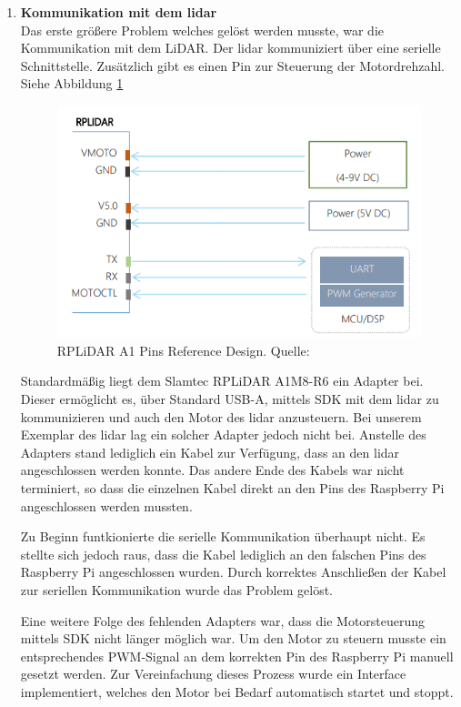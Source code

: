 \begin{enumerate}[leftmargin=*]
    \item \textbf{Kommunikation mit dem \ac{lidar}} \\
    Das erste größere Problem welches gelöst werden musste, war die Kommunikation mit dem LiDAR.
    Der \ac{lidar} kommuniziert über eine serielle Schnittstelle.
    Zusätzlich gibt es einen Pin zur Steuerung der Motordrehzahl. 
    Siehe Abbildung \ref{fig:lidar_pins}

    \begin{figure}[H]
        \centering
        \includegraphics[width=12cm]{graphics/lidar_pin_layout.png}
        \caption{RPLiDAR A1 Pins Reference Design. Quelle: \cite[p. 12]{Slamtec2023} }
        \label{fig:lidar_pins}
    \end{figure}

    Standardmäßig liegt dem Slamtec RPLiDAR A1M8-R6 ein Adapter bei.
    Dieser ermöglicht es, über Standard USB-A, mittels SDK mit dem \ac{lidar} zu kommunizieren und auch den Motor des \ac{lidar} anzusteuern.
    Bei unserem Exemplar des \ac{lidar} lag ein solcher Adapter jedoch nicht bei.
    Anstelle des Adapters stand lediglich ein Kabel zur Verfügung, dass an den \ac{lidar} angeschlossen werden konnte.
    Das andere Ende des Kabels war nicht terminiert, so dass die einzelnen Kabel direkt an den Pins des Raspberry Pi angeschlossen werden mussten.

    Zu Beginn funtkionierte die serielle Kommunikation überhaupt nicht.
    Es stellte sich jedoch raus, dass die Kabel lediglich an den falschen Pins des Raspberry Pi angeschlossen wurden.
    Durch korrektes Anschließen der Kabel zur seriellen Kommunikation wurde das Problem gelöst.

    Eine weitere Folge des fehlenden Adapters war, dass die Motorsteuerung mittels SDK nicht länger möglich war.
    Um den Motor zu steuern musste ein entsprechendes PWM-Signal an dem korrekten Pin des Raspberry Pi manuell gesetzt werden.
    Zur Vereinfachung dieses Prozess wurde ein Interface implementiert, welches den Motor bei Bedarf automatisch startet und stoppt.


\end{enumerate}
